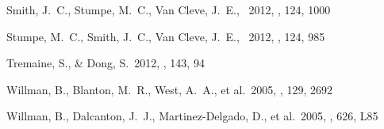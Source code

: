\documentclass[letterpaper,12pt,preprint]{hack_aastex}
\begin{document}
\begin{thebibliography}{}
Smith, J.~C., Stumpe, M.~C., Van Cleve, J.~E., \etal\ 2012, \pasp, 124, 1000

Stumpe, M.~C., Smith, J.~C., Van Cleve, J.~E., \etal\ 2012, \pasp, 124, 985

Tremaine, S., \& Dong, S.\ 2012, \aj, 143, 94

Willman, B., Blanton, M.~R., West, A.~A., et al.\ 2005, \aj, 129, 2692

Willman, B., Dalcanton, J.~J., Martinez-Delgado, D., et al.\ 2005, \apjl, 626, L85
\end{thebibliography}
\end{document}

